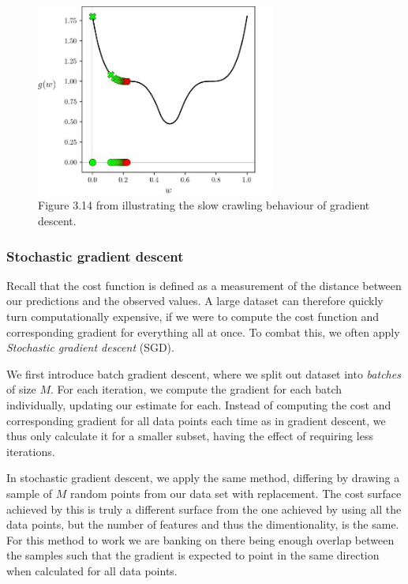 \documentclass{article}
\theoremstyle{definition}
\begin{document}
\begin{figure}[H]
    \centering
    \includegraphics[width=0.7\textwidth]{Project2/figures/Gradient_descent_saddle_crawl.jpeg}
    \caption{Figure 3.14 from \parencite[p.~70]{MLRefined} illustrating the slow crawling behaviour of gradient descent.}
    \label{fig:CrawlGradientDescent}
\end{figure}

\subsubsection{Stochastic gradient descent}
Recall that the cost function is defined as a measurement of the distance between our predictions and the observed values. A large dataset can therefore quickly turn computationally expensive, if we were to compute the cost function and corresponding gradient for everything all at once. To combat this, we often apply \textit{Stochastic gradient descent} (SGD).

We first introduce batch gradient descent, where we split out dataset into \textit{batches} of size $M$. For each iteration, we compute the gradient for each batch individually, updating our estimate for each. Instead of computing the cost and corresponding gradient for all data points each time as in gradient descent, we thus only calculate it for a smaller subset, having the effect of requiring less iterations.

In stochastic gradient descent, we apply the same method, differing by drawing a sample of $M$ random points from our data set with replacement. The cost surface achieved by this is truly a different surface from the one achieved by using all the data points, but the number of features and thus the dimentionality, is the same. For this method to work we are banking on there being enough overlap between the samples such that the gradient is expected to point in the same direction when calculated for all data points.
\end{document}
